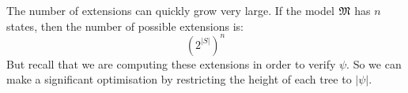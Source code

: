 The number of extensions can quickly grow very large.
If the model $\frak{M}$ has $n$ states, then the number of possible extensions is:
\[
({2^{|S|}})^n
\] 
But recall that we are computing these extensions in order to verify $\psi$. So we can make a significant optimisation by restricting the height of each tree to $|\psi|$.


